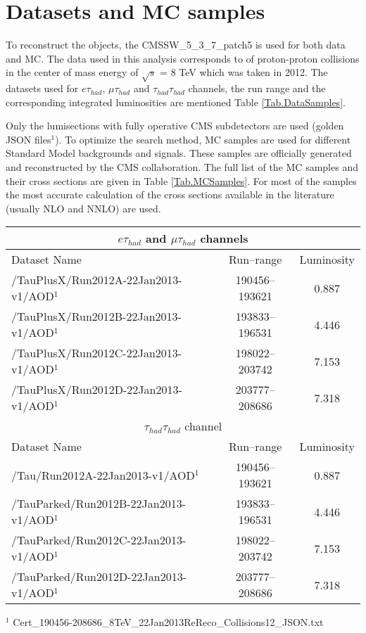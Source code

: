 \section{Datasets and MC samples}
\label{sect:dataMC}
To reconstruct the objects, the CMSSW\_5\_3\_7\_patch5 is used for both data and MC.
The data used in this analysis corresponds to \IL of proton-proton collisions in the center of mass energy of $\sqrt{s}$ = 8 TeV 
which was taken in 2012. The datasets used for $e\tau_{had}$, $\mu\tau_{had}$ and $\tau_{had}\tau_{had}$ channels, the run range and the corresponding integrated luminosities are mentioned Table \ref{Tab.DataSamples}.

Only the lumisections with fully operative CMS subdetectors are used (golden JSON files$^{1}$). To optimize the search method, MC 
samples are used for different Standard Model backgrounds and signals. These samples are officially generated and reconstructed by the CMS
collaboration. The full list of the MC samples and their cross sections are given in Table \ref{Tab.MCSamples}. For most of the samples the most 
accurate calculation of the cross sections available in the literature (usually NLO and NNLO) are used. 



\begin{table}[!h]
\begin{center}
\begin{tabular}{|l|c|c|}
\hline
\multicolumn{3}{|c|}{$e\tau_{had}$ and $\mu\tau_{had}$ channels} \\
\hline
Dataset Name & Run--range & Luminosity \\
\hline
/TauPlusX/Run2012A-22Jan2013-v1/AOD$^{1}$   & 190456--193621 & 0.887\\
/TauPlusX/Run2012B-22Jan2013-v1/AOD$^{1}$   & 193833--196531 & 4.446\\
/TauPlusX/Run2012C-22Jan2013-v1/AOD$^{1}$   & 198022--203742 & 7.153\\
/TauPlusX/Run2012D-22Jan2013-v1/AOD$^{1}$   & 203777--208686 & 7.318\\
\hline
\hline
\multicolumn{3}{|c|}{$\tau_{had}\tau_{had}$ channel} \\
\hline
Dataset Name & Run--range & Luminosity \\
\hline
/Tau/Run2012A-22Jan2013-v1/AOD$^{1}$   & 190456--193621 & 0.887 \\
/TauParked/Run2012B-22Jan2013-v1/AOD$^{1}$ & 193833--196531 & 4.446 \\
/TauParked/Run2012C-22Jan2013-v1/AOD$^{1}$ & 198022--203742 & 7.153 \\
/TauParked/Run2012D-22Jan2013-v1/AOD$^{1}$ & 203777--208686 & 7.318 \\
\hline

\end{tabular}
\end{center}
$^{1}$ Cert\_190456-208686\_8TeV\_22Jan2013ReReco\_Collisions12\_JSON.txt \\
\end{table}
\label{Tab.DataSamples}




